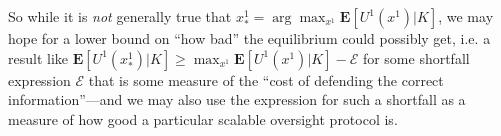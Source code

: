 So while it is \emph{not} generally true that $x^1_*=\arg\max_{x^1}\mathbf{E}[U^1(x^1)|K]$, we may hope for a lower bound on ``how bad'' the equilibrium could possibly get, i.e. a result like $\mathbf{E}[U^1(x^1_*)|K]\ge \max_{x^1}\mathbf{E}[U^1(x^1)|K]-\mathcal{E}$ for some shortfall expression $\mathcal{E}$ that is some measure of the ``cost of defending the correct information''---and we may also use the expression for such a shortfall as a measure of how good a particular scalable oversight protocol is.





